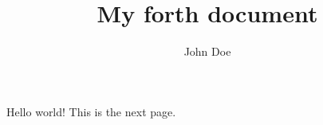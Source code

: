 \documentclass{article}
\title{My forth document}
\author{John Doe}
\begin{document}
   \maketitle
   Hello world!
   \newpage
   This is the next page.
\end{document}
